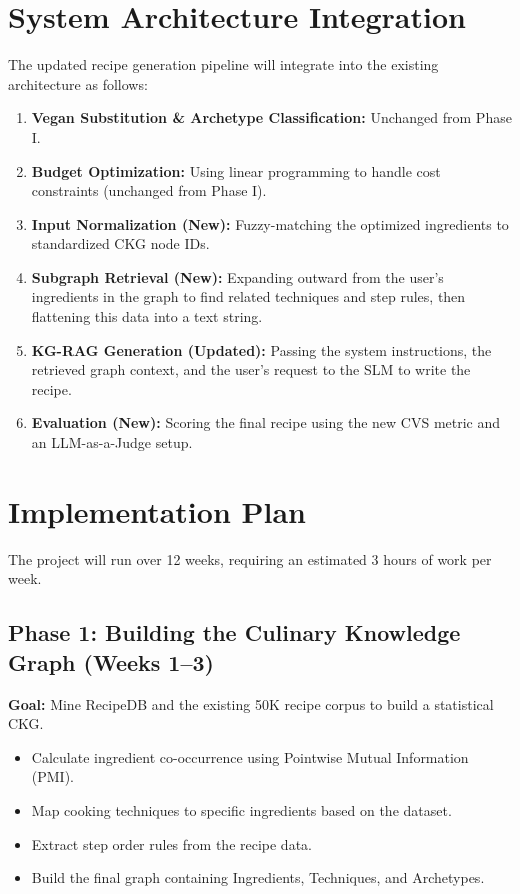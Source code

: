 \documentclass[12pt,a4paper]{article}
\begin{document}
\section*{System Architecture Integration}
The updated recipe generation pipeline will integrate into the existing architecture as follows:
\begin{enumerate}[noitemsep]
    \item \textbf{Vegan Substitution \& Archetype Classification:} Unchanged from Phase I.
    \item \textbf{Budget Optimization:} Using linear programming to handle cost constraints (unchanged from Phase I).
    \item \textbf{Input Normalization (New):} Fuzzy-matching the optimized ingredients to standardized CKG node IDs.
    \item \textbf{Subgraph Retrieval (New):} Expanding outward from the user's ingredients in the graph to find related techniques and step rules, then flattening this data into a text string.
    \item \textbf{KG-RAG Generation (Updated):} Passing the system instructions, the retrieved graph context, and the user's request to the SLM to write the recipe.
    \item \textbf{Evaluation (New):} Scoring the final recipe using the new CVS metric and an LLM-as-a-Judge setup.
\end{enumerate}

\section*{Implementation Plan}
The project will run over 12 weeks, requiring an estimated 3 hours of work per week.

\subsection*{Phase 1: Building the Culinary Knowledge Graph (Weeks 1--3)}
\textbf{Goal:} Mine RecipeDB and the existing 50K recipe corpus to build a statistical CKG.
\begin{itemize}[noitemsep]
    \item Calculate ingredient co-occurrence using Pointwise Mutual Information (PMI).
    \item Map cooking techniques to specific ingredients based on the dataset.
    \item Extract step order rules from the recipe data.
    \item Build the final graph containing Ingredients, Techniques, and Archetypes.
\end{itemize}
\end{document}
